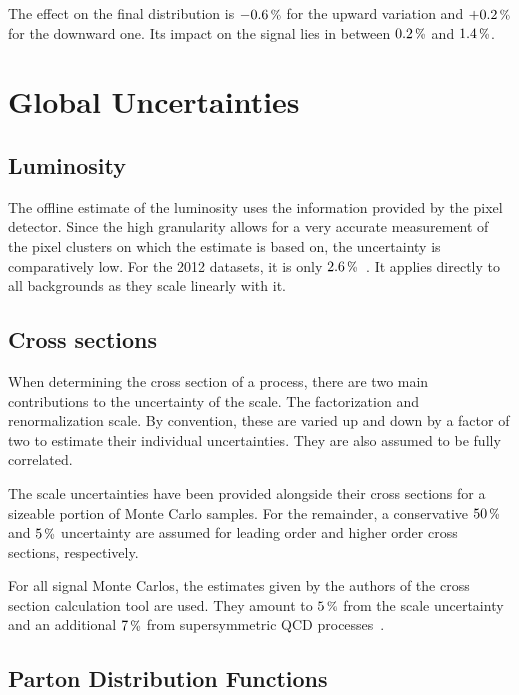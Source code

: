 The effect on the final distribution is $-0.6\,\pct$ for the upward variation and $+0.2\,\pct$ for the downward one. Its impact on the signal lies in between $0.2\,\pct$ and $1.4\,\pct$. 



\section{Global Uncertainties}
\label{sec:glblsys}

\subsection{Luminosity}
\label{sec:lumisys}

The offline estimate of the luminosity uses the information provided by the pixel detector. Since the high granularity allows for a very accurate measurement of the pixel clusters on which the estimate is based on, the uncertainty is comparatively low. For the 2012 datasets, it is only $2.6\,\pct$~\cite{lumisys}. It applies directly to all backgrounds as they scale linearly with it.


\subsection{Cross sections}
\label{sec:xssys}

When determining the cross section of a process, there are two main contributions to the uncertainty of the scale. The factorization and renormalization scale. By convention, these are varied up and down by a factor of two to estimate their individual uncertainties. They are also assumed to be fully correlated.

The scale uncertainties have been provided alongside their cross sections for a sizeable portion of Monte Carlo samples. For the remainder, a conservative $50\,\pct$ and $5\,\pct$ uncertainty are assumed for leading order and higher order cross sections, respectively.

For all signal Monte Carlos, the estimates given by the authors of the cross section calculation tool are used. They amount to $5\,\pct$ from the scale uncertainty and an additional $7\,\pct$ from supersymmetric QCD processes~\cite{susyxstool}.


\subsection{Parton Distribution Functions}
\label{sec:pdfsys}


